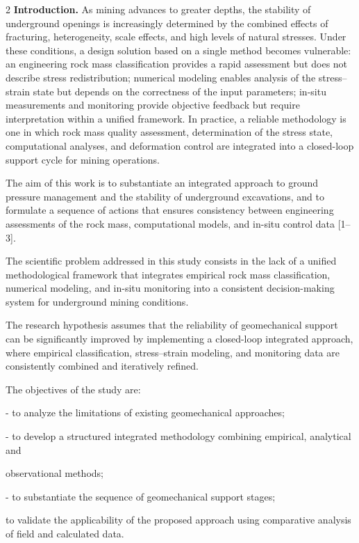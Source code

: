 \begin{multicols}{2}
\textbf{Introduction.} As mining advances to greater depths, the
stability of underground openings is increasingly determined by the
combined effects of fracturing, heterogeneity, scale effects, and high
levels of natural stresses. Under these conditions, a design solution
based on a single method becomes vulnerable: an engineering rock mass
classification provides a rapid assessment but does not describe stress
redistribution; numerical modeling enables analysis of the
stress--strain state but depends on the correctness of the input
parameters; in-situ measurements and monitoring provide objective
feedback but require interpretation within a unified framework. In
practice, a reliable methodology is one in which rock mass quality
assessment, determination of the stress state, computational analyses,
and deformation control are integrated into a closed-loop support cycle
for mining operations.

The aim of this work is to substantiate an integrated approach to ground
pressure management and the stability of underground excavations, and to
formulate a sequence of actions that ensures consistency between
engineering assessments of the rock mass, computational models, and
in-situ control data {[}1--3{]}.

The scientific problem addressed in this study consists in the lack of a
unified methodological framework that integrates empirical rock mass
classification, numerical modeling, and in-situ monitoring into a
consistent decision-making system for underground mining conditions.

The research hypothesis assumes that the reliability of geomechanical
support can be significantly improved by implementing a closed-loop
integrated approach, where empirical classification, stress--strain
modeling, and monitoring data are consistently combined and iteratively
refined.

The objectives of the study are:

- to analyze the limitations of existing geomechanical approaches;

- to develop a structured integrated methodology combining empirical,
analytical and

observational methods;

- to substantiate the sequence of geomechanical support stages;

to validate the applicability of the proposed approach using comparative
analysis of field and calculated data.


\end{multicols}
